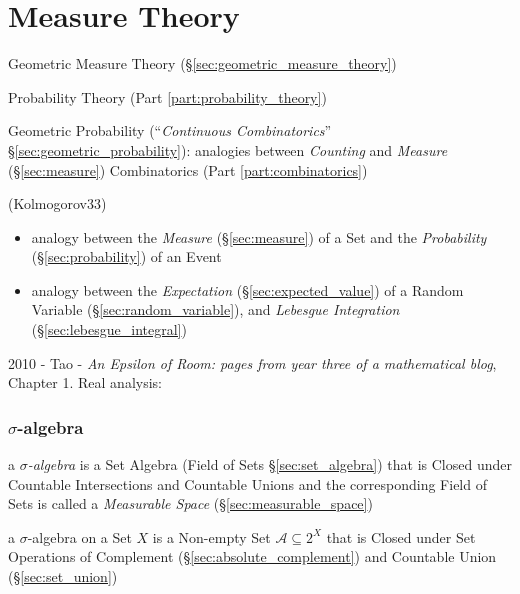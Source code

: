\part{Measure Theory}\label{part:measure_theory}

\fist Geometric Measure Theory (\S\ref{sec:geometric_measure_theory})

\fist Probability Theory (Part \ref{part:probability_theory})

\fist Geometric Probability (``\emph{Continuous Combinatorics}''
\S\ref{sec:geometric_probability}): analogies between \emph{Counting} and
\emph{Measure} (\S\ref{sec:measure}) \fist Combinatorics (Part
\ref{part:combinatorics})

(Kolmogorov33)

\begin{itemize}
  \item analogy between the \emph{Measure} (\S\ref{sec:measure}) of a Set and
    the \emph{Probability} (\S\ref{sec:probability}) of an Event
  \item analogy between the \emph{Expectation} (\S\ref{sec:expected_value}) of a
    Random Variable (\S\ref{sec:random_variable}), and \emph{Lebesgue
      Integration} (\S\ref{sec:lebesgue_integral})
\end{itemize}

2010 - Tao - \emph{An Epsilon of Room: pages from year three of a mathematical
  blog}, Chapter 1. Real analysis:



\section{$\sigma$-algebra}\label{sec:sigma_algebra}

a \emph{$\sigma$-algebra} is a Set Algebra (Field of Sets
\S\ref{sec:set_algebra}) that is Closed under Countable Intersections and
Countable Unions and the corresponding Field of Sets is called a
\emph{Measurable Space} (\S\ref{sec:measurable_space})

a $\sigma$-algebra on a Set $X$ is a Non-empty Set $\mathcal{A} \subseteq 2^X$
that is Closed under Set Operations of Complement
(\S\ref{sec:absolute_complement}) and Countable Union (\S\ref{sec:set_union})

